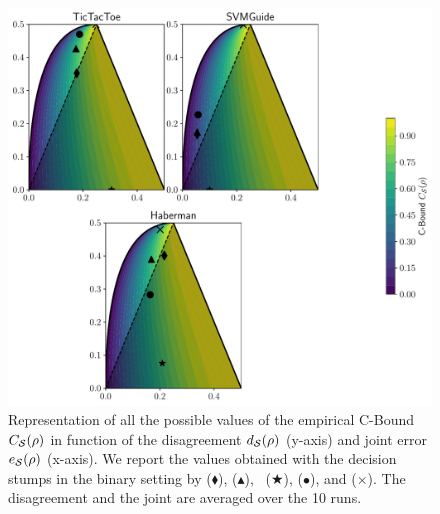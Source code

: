 \begin{noaddcontents}
\begin{figure}
    \centering
    \includegraphics[width=1.0\linewidth]{chapter_4/figures/cbound_stump_binary_2.pdf}
    \caption{
    Representation of all the possible values of the empirical C-Bound ${C}_{\mathcal{S}}(\rho)$ in function of the disagreement $d_{\mathcal{S}}(\rho)$ (y-axis) and joint error $e_{\mathcal{S}}(\rho)$ (x-axis).
We report the values obtained with the decision stumps in the binary setting by  ($\blacklozenge$), \algomasegosa ($\blacktriangle$), \algogermain~($\bigstar$), \cbboost ($\bullet$), and \mincq ($\boldsymbol{\times}$).
The disagreement and the joint are averaged over the 10 runs.
    }
    \label{chap:mv:fig:cbound-stump-binary-2}
\end{figure}


\end{noaddcontents}
